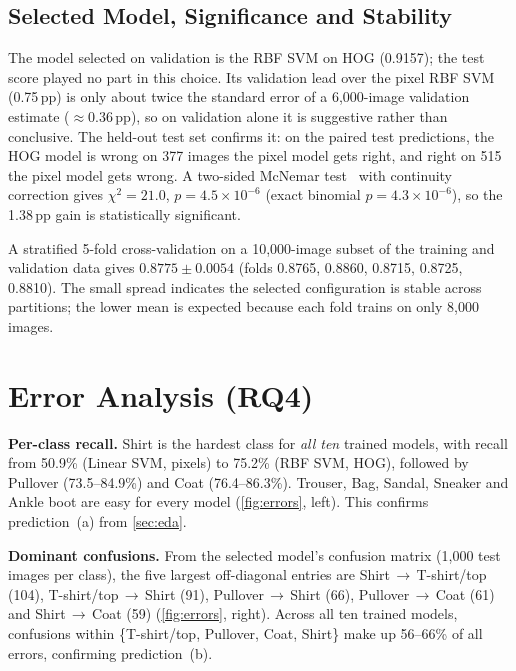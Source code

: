 \documentclass[conference]{IEEEtran}
\newcommand{\pp}{\,pp}                       %
\begin{document}
\subsection{Selected Model, Significance and Stability}
The model selected on validation is the RBF SVM on HOG (0.9157); the test score played no part in this choice. Its
validation lead over the pixel RBF SVM (0.75\pp) is only about twice the standard error of a 6{,}000-image validation
estimate ($\approx$0.36\pp), so on validation alone it is suggestive rather than conclusive. The held-out test set
confirms it: on the paired test predictions, the HOG model is wrong on 377 images the pixel model gets right, and right
on 515 the pixel model gets wrong. A two-sided McNemar test~\cite{mcnemar1947note} with continuity correction gives $\chi^2=21.0$,
$p=4.5\times10^{-6}$ (exact binomial $p=4.3\times10^{-6}$), so the 1.38\pp{} gain is statistically significant.

A stratified 5-fold cross-validation on a 10{,}000-image subset of the training and validation data gives
$0.8775\pm0.0054$ (folds 0.8765, 0.8860, 0.8715, 0.8725, 0.8810). The small spread indicates the selected configuration is
stable across partitions; the lower mean is expected because each fold trains on only 8{,}000 images.

\section{Error Analysis (RQ4)}
\label{sec:errors}
\textbf{Per-class recall.} Shirt is the hardest class for \emph{all ten} trained models, with recall from 50.9\% (Linear
SVM, pixels) to 75.2\% (RBF SVM, HOG), followed by Pullover (73.5--84.9\%) and Coat (76.4--86.3\%). Trouser, Bag, Sandal,
Sneaker and Ankle boot are easy for every model (\cref{fig:errors}, left). This confirms prediction~(a) from \cref{sec:eda}.

\textbf{Dominant confusions.} From the selected model's confusion matrix (1{,}000 test images per class), the five largest
off-diagonal entries are Shirt\,$\rightarrow$\,T-shirt/top (104), T-shirt/top\,$\rightarrow$\,Shirt (91),
Pullover\,$\rightarrow$\,Shirt (66), Pullover\,$\rightarrow$\,Coat (61) and Shirt\,$\rightarrow$\,Coat (59)
(\cref{fig:errors}, right). Across all ten trained models, confusions within \{T-shirt/top, Pullover, Coat, Shirt\} make up
56--66\% of all errors, confirming prediction~(b).
\end{document}
